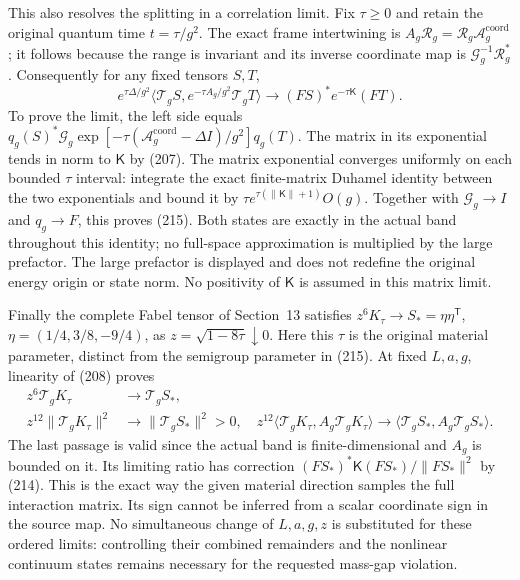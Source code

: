 \documentclass[11pt]{article}
\begin{document}
This also resolves the splitting in a correlation limit. Fix
$\tau\ge0$ and retain the original quantum time $t=\tau/g^2$.
The exact frame intertwining is
$A_g\mathcal R_g=\mathcal R_g\mathcal A_g^{\mathrm{coord}}$;
it follows because the range is invariant and its inverse coordinate
map is $\mathcal G_g^{-1}\mathcal R_g^*$. Consequently for any
fixed tensors $S,T$,
\begin{equation}\label{eq:band-long-time}
 e^{\tau\Delta/g^2}
 \langle\mathcal T_gS,e^{-\tau A_g/g^2}\mathcal T_gT\rangle
 \longrightarrow (FS)^*e^{-\tau\mathsf K}(FT).
\end{equation}
To prove the limit, the left side equals
$q_g(S)^*\mathcal G_g
 \exp[-\tau(\mathcal A_g^{\mathrm{coord}}-\Delta I)/g^2]q_g(T)$.
The matrix in its exponential tends in norm to $\mathsf K$ by
(207). The matrix exponential converges
uniformly on each bounded $\tau$ interval: integrate the exact
finite-matrix Duhamel identity between the two exponentials and
bound it by $\tau e^{\tau(\|\mathsf K\|+1)}O(g)$.
Together with $\mathcal G_g\to I$ and $q_g\to F$, this proves
(215). Both states are exactly in the actual
band throughout this identity; no full-space approximation is
multiplied by the large prefactor. The large prefactor is displayed and
does not redefine the original energy origin or state norm. No
positivity of $\mathsf K$ is assumed in this matrix limit.

Finally the complete Fabel tensor of Section~13 satisfies
$z^6K_\tau\to S_*=\eta\eta^{\mathsf T}$,
$\eta=(1/4,3/8,-9/4)$, as $z=\sqrt{1-8\tau}\downarrow0$.
Here this $\tau$ is the original material parameter, distinct from
the semigroup parameter in (215). At fixed
$L,a,g$, linearity of (208) proves
\begin{align}
 z^6\mathcal T_gK_\tau&\longrightarrow\mathcal T_gS_*,\nonumber\\
 z^{12}\|\mathcal T_gK_\tau\|^2&\longrightarrow\|\mathcal T_gS_*\|^2>0,
 \quad
 z^{12}\langle\mathcal T_gK_\tau,A_g\mathcal T_gK_\tau\rangle
       \longrightarrow\langle\mathcal T_gS_*,A_g\mathcal T_gS_*\rangle.
 \label{eq:band-cusp-raw}
\end{align}
The last passage is valid since the actual band is finite-dimensional
and $A_g$ is bounded on it. Its limiting ratio has correction
$(FS_*)^*\mathsf K(FS_*)/\|FS_*\|^2$ by
(214). This is the exact way the given
material direction samples the full interaction matrix. Its sign
cannot be inferred from a scalar coordinate sign in the source map.
No simultaneous change of $L,a,g,z$ is substituted for these ordered
limits: controlling their combined remainders and the nonlinear
continuum states remains necessary for the requested mass-gap violation.
\end{document}
